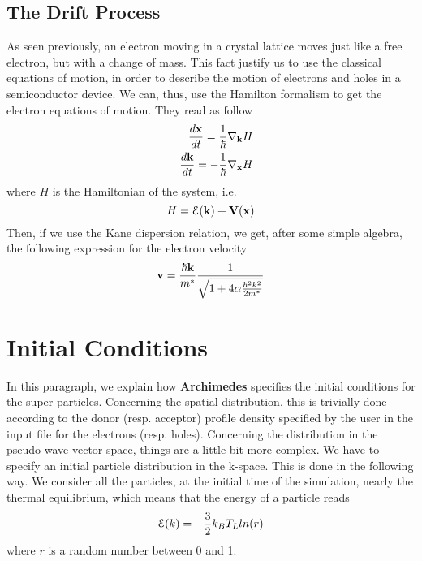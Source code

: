 \documentclass[12pt]{book}
\begin{document}
\subsection{The Drift Process}
As seen previously, an electron moving in a crystal lattice moves just like a free electron, but with a change of mass. This fact justify us to use the classical equations of motion, in order to describe the motion of electrons and holes in a semiconductor device. We can, thus, use the Hamilton formalism to get the electron equations of motion. They read as follow
\begin{eqnarray}
& & \frac{d \bf{x}}{dt} = \frac{1}{\hbar} \nabla_{\bf{k}} H \\
& & \frac{d \bf{k}}{dt} = -\frac{1}{\hbar} \nabla_{\bf{x}} H
\end{eqnarray}
where $H$ is the Hamiltonian of the system, i.e.
$$ H = {\cal{E}}(\bf{k}) + V(\bf{x}) $$
Then, if we use the Kane dispersion relation, we get, after some simple algebra, the following expression for the electron velocity
\begin{equation}
 {\bf{v}} = \frac{\hbar {\bf{k}}}{m^*} \frac{1}{\sqrt{1 + 4 \alpha \frac{\hbar^2 k^2}{2 m^*}}}
\end{equation}

\section{Initial Conditions}

In this paragraph, we explain how \textbf{Archimedes} specifies the initial conditions for the super-particles. Concerning the spatial distribution, this is trivially done according to the donor (resp. acceptor) profile density specified by the user in the input file for the electrons (resp. holes). Concerning the distribution in the pseudo-wave vector space, things are a little bit more complex. We have to specify an initial particle distribution in the k-space. This is done in the following way.
We consider all the particles, at the initial time of the simulation, nearly the thermal equilibrium, which means that the energy of a particle reads
\begin{equation}
 {\cal{E}}(k) = -\frac{3}{2} k_B T_L ln (r)
\end{equation}
where $r$ is a random number between 0 and 1.
\end{document}
